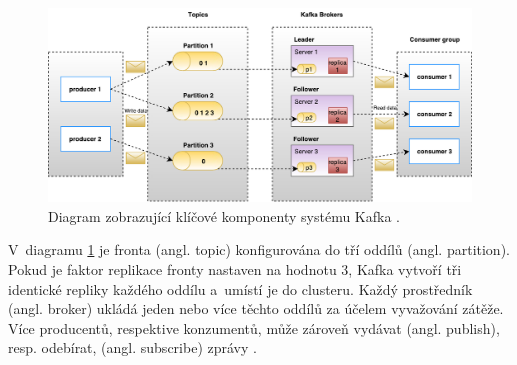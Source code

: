 \begin{figure}[!h]
  \centering
  \includegraphics[width=15cm]{template-fig/Kafka_architecture.pdf}
  \caption{Diagram zobrazující klíčové komponenty systému Kafka \cite{kafkaTutorialsPoint}.}
  \label{FIG_KafkaArchitecture}
\end{figure}

\noindent V~diagramu \ref{FIG_KafkaArchitecture} je fronta (angl. topic) konfigurována do tří oddílů (angl. partition). Pokud je faktor replikace fronty nastaven na hodnotu 3, Kafka vytvoří tři identické repliky každého oddílu a~umístí je do clusteru. Každý prostředník (angl. broker) ukládá jeden nebo více těchto oddílů za účelem vyvažování zátěže. Více producentů, respektive konzumentů, může zároveň vydávat (angl. publish), resp. odebírat, (angl. subscribe) zprávy \cite{kafkaTutorialsPoint}.

